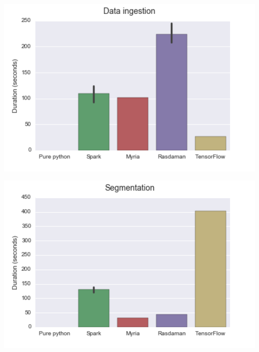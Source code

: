\documentclass[a0,landscape]{a0poster}
\begin{document}
\begin{multicols}{3}
\begin{minipage}[b]{0.5\linewidth}
  \includegraphics[width=17cm]{DataIngestion.png}
\end{minipage}
\begin{minipage}[b]{0.5\linewidth}
  \includegraphics[width=17cm]{Segmentation.png}
\end{minipage}



\end{multicols}
\end{document}
